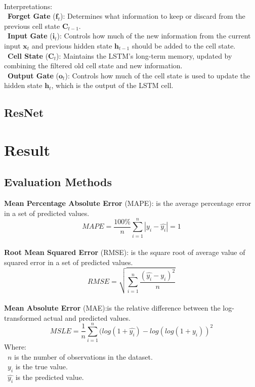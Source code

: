 \documentclass{ieeeojies}
\begin{document}
\\
Interpretations: \\
         \indent\textbullet\ \textbf{Forget Gate} (\(\mathbf{f}_t\)): 
         Determines what information to keep or discard from the previous cell state \(\mathbf{C}_{t-1}\). \\
         \indent\textbullet\ \textbf{Input Gate} (\(\mathbf{i}_t\)): Controls how much of the new information from the current input \(\mathbf{x}_t\) and previous hidden state \(\mathbf{h}_{t-1}\) should be added to the cell state. \\
         \indent\textbullet\ \textbf{Cell State} (\(\mathbf{C}_t\)): Maintains the LSTM's long-term memory, updated by combining the filtered old cell state and new information. \\
         \indent\textbullet\ \textbf{Output Gate} (\(\mathbf{o}_t\)): Controls how much of the cell state is used to update the hidden state \(\mathbf{h}_t\), which is the output of the LSTM cell. \\ 

\subsection{ResNet}

\section{Result}
\subsection{Evaluation Methods}
\textbf{Mean Percentage Absolute Error} (MAPE): is the average percentage error in a set of predicted values.\\
\[MAPE=\frac{100\%}{n}  \sum_{i=1}^{n} |y_i-\hat{y_i} |  = 1 \]\\
\textbf{Root Mean Squared Error} (RMSE): is the square root of average value of squared error in a set of predicted values.\\
\[RMSE=\sqrt{\sum_{i=1}^{n} \frac{(\hat{y_i}-y_i )^2}{n} }\]\\
\textbf{Mean Absolute Error} (MAE):is the relative difference between the log-transformed actual and predicted values.\\
\[MSLE=\frac{1}{n}\sum_{i=1}^{n}(log(1+\hat{y_i})-log(log(1+y_i))^2\]
Where: \\
	\indent\textbullet\ \(n\) is the number of observations in the dataset.\\
	\indent\textbullet\ \(y_i\)  is the true value.\\
	\indent\textbullet\ \(\hat{y_i}\) is the predicted value.
\end{document}
